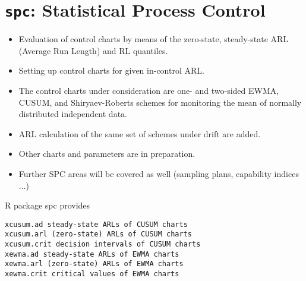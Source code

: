 \documentclass[11pt]{article} %
\begin{document}
\tableofcontents
\newpage
\section{ \texttt{spc}: Statistical Process Control }


\begin{itemize}
\item Evaluation of control charts by means of the zero-state, steady-state ARL (Average Run Length) and RL quantiles. 

\item Setting up control charts for given in-control ARL. 

\item The control charts under consideration are one- and two-sided EWMA, CUSUM, and Shiryaev-Roberts schemes for monitoring the mean of normally distributed independent data. 

\item
ARL calculation of the same set of schemes under drift are added. 

\item Other charts and parameters are in preparation. 

\item Further SPC areas will be covered as well (sampling plans, capability indices ...)
\end{itemize}


R package spc provides

\begin{verbatim}
xcusum.ad steady-state ARLs of CUSUM charts
xcusum.arl (zero-state) ARLs of CUSUM charts
xcusum.crit decision intervals of CUSUM charts
xewma.ad steady-state ARLs of EWMA charts
xewma.arl (zero-state) ARLs of EWMA charts
xewma.crit critical values of EWMA charts
\end{verbatim}
\end{document}
